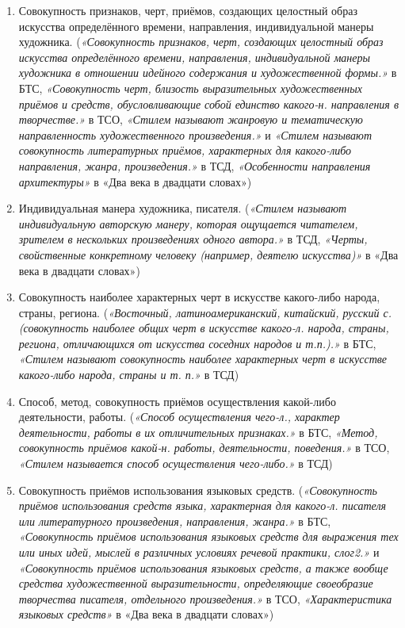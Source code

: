 \begin{enumerate}
    \item Совокупность признаков, черт, приёмов, создающих целостный образ искусства определённого времени, направления, индивидуальной манеры художника.
(\textit{«Совокупность признаков, черт, создающих целостный образ искусства определённого времени, направления, индивидуальной манеры художника в отношении идейного содержания и художественной формы.»} в БТС,
\textit{«Совокупность черт, близость выразительных художественных приёмов и средств, обусловливающие собой единство какого-н. направления в творчестве.»} в ТСО,
\textit{«Стилем называют жанровую и тематическую направленность художественного произведения.»} и \textit{«Стилем называют совокупность литературных приёмов, характерных для какого-либо направления, жанра, произведения.»} в ТСД,
\textit{«Особенности направления архитектуры»} в «Два века в двадцати словах»)

    \item Индивидуальная манера художника, писателя.
(\textit{«Стилем называют индивидуальную авторскую манеру, которая ощущается читателем, зрителем в нескольких произведениях одного автора.»} в ТСД,
\textit{«Черты, свойственные конкретному человеку (например, деятелю искусства)»} в «Два века в двадцати словах»)

    \item Совокупность наиболее характерных черт в искусстве какого-либо народа, страны, региона.
(\textit{«Восточный, латиноамериканский, китайский, русский с. (совокупность наиболее общих черт в искусстве какого-л. народа, страны, региона, отличающихся от искусства соседних народов и т.п.).»} в БТС,
\textit{«Стилем называют совокупность наиболее характерных черт в искусстве какого-либо народа, страны и т. п.»} в ТСД)

    \item Способ, метод, совокупность приёмов осуществления какой-либо деятельности, работы.
(\textit{«Способ осуществления чего-л., характер деятельности, работы в их отличительных признаках.»} в БТС,
\textit{«Метод, совокупность приёмов какой-н. работы, деятельности, поведения.»} в ТСО,
\textit{«Стилем называется способ осуществления чего-либо.»} в ТСД)

    \item Совокупность приёмов использования языковых средств.
(\textit{«Совокупность приёмов использования средств языка, характерная для какого-л. писателя или литературного произведения, направления, жанра.»} в БТС,
\textit{«Совокупность приёмов использования языковых средств для выражения тех или иных идей, мыслей в различных условиях речевой практики, слог2.»} и \textit{«Совокупность приёмов использования языковых средств, а также вообще средства художественной выразительности, определяющие своеобразие творчества писателя, отдельного произведения.»} в ТСО,
\textit{«Характеристика языковых средств»} в «Два века в двадцати словах»)


\end{enumerate}

